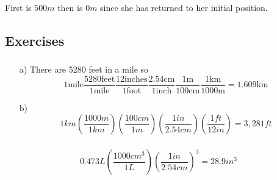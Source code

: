 \documentclass[%
 reprint,
superscriptaddress,
 amsmath,amssymb,
 aps,
prc,
]{revtex4-1}
\begin{document}
\subsubsection{}
First is $500m$ then is $0m$ since she has returned to her initial position.

\subsubsection{}

\subsection{Exercises}
\subsubsection{}
\begin{enumerate}
\item[a)] There are 5280 feet in a mile so
\begin{equation*}
1\text{mile}\dfrac{5280\text{feet}}{1\text{mile}}\dfrac{12\text{inches}}{1\text{foot}}\dfrac{2.54\text{cm}}{1\text{inch}}\dfrac{1\text{m}}{100\text{cm}}\dfrac{1\text{km}}{1000\text{m}}=1.609\text{km}
\end{equation*} 
\item[b)]
\begin{equation}
1km\left(\dfrac{1000m}{1km}\right)\left(\dfrac{100cm}{1m}\right)\left(\dfrac{1in}{2.54cm}\right)\left(\dfrac{1ft}{12in}\right)=3,281ft
\end{equation}
\end{enumerate}
\subsubsection{}
\begin{equation}
0.473L\left(\dfrac{1000cm^3}{1L}\right)\left(\dfrac{1in}{2.54cm}\right)^3=28.9in^3
\end{equation}
\subsubsection{}
\end{document}
